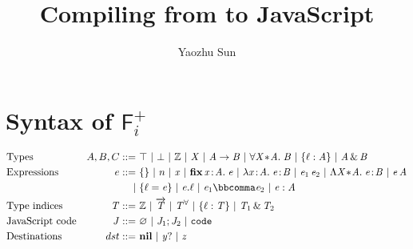 \documentclass{article}
\title{Compiling from \calculus to JavaScript}
\author{Yaozhu Sun}
\newcommand\calculus{$\mathsf{F}_i^+$\xspace}
\begin{document}
\maketitle

\section*{Syntax of \calculus}
\begin{align*}
  &\text{Types}          &A,B,C ::=&~  \top  ~|~  \bot  ~|~  \mathbb{Z}  ~|~ \ottmv{X} ~|~ \ottnt{A}  \rightarrow  \ottnt{B} ~|~  \forall  \ottmv{X} \!*\! \ottnt{A} .\; \ottnt{B}  ~|~ \ottsym{\{}  \ell  \ottsym{:}  \ottnt{A}  \ottsym{\}} ~|~ \ottnt{A}  \, \& \,  \ottnt{B} \\
  &\text{Expressions}    &    e ::=&~ \ottsym{\{\}} ~|~  n  ~|~ \ottmv{x} ~|~  \ottkw{fix} \, \ottmv{x} \!:\! \ottnt{A} .\; \ottnt{e}  ~|~  \lambda \ottmv{x} \!:\! \ottnt{A} .\; \ottnt{e} \!:\! \ottnt{B}  ~|~ \ottnt{e_{{\mathrm{1}}}} \, \ottnt{e_{{\mathrm{2}}}} ~|~  \Lambda \ottmv{X} \!*\! \ottnt{A} .\; \ottnt{e} \!:\! \ottnt{B}  ~|~ \ottnt{e} \, \ottnt{A} \\
  &                      &        |&~ \ottsym{\{}  \ell  \ottsym{=}  \ottnt{e}  \ottsym{\}} ~|~ \ottnt{e}  \ottsym{.}  \ell ~|~  \ottnt{e_{{\mathrm{1}}}} \bbcomma \ottnt{e_{{\mathrm{2}}}}  ~|~ \ottnt{e}  \ottsym{:}  \ottnt{A} \\
  &\text{Type indices}   &\ottnt{T} ::=&~  \mathbb{Z}  ~|~  \overrightarrow{ \ottnt{T} }  ~|~  \ottnt{T} ^\forall  ~|~ \ottsym{\{}  \ell  \ottsym{:}  \ottnt{T}  \ottsym{\}} ~|~ \ottnt{T_{{\mathrm{1}}}}  \, \& \,  \ottnt{T_{{\mathrm{2}}}} \\
  &\text{JavaScript code}&\ottnt{J} ::=&~  \varnothing  ~|~ \ottnt{J_{{\mathrm{1}}}}  \ottsym{;}  \ottnt{J_{{\mathrm{2}}}} ~|~ \mathtt{code} \\
  &\text{Destinations}   &  dst ::=&~ \ottkw{nil} ~|~ \ottmv{y}  \ottsym{\mbox{?}} ~|~ \ottmv{z}
\end{align*}

\bigskip
\ottdefncompile
\end{document}

